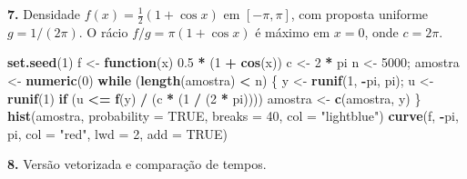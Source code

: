 \documentclass[
  portuguese,
  11pt,
  openany]{book}
\newenvironment{Shaded}{\begin{snugshade}}{\end{snugshade}}
\newcommand{\AttributeTok}[1]{\textcolor[rgb]{0.13,0.29,0.53}{#1}}
\newcommand{\ConstantTok}[1]{\textcolor[rgb]{0.56,0.35,0.01}{#1}}
\newcommand{\ControlFlowTok}[1]{\textcolor[rgb]{0.13,0.29,0.53}{\textbf{#1}}}
\newcommand{\DecValTok}[1]{\textcolor[rgb]{0.00,0.00,0.81}{#1}}
\newcommand{\FloatTok}[1]{\textcolor[rgb]{0.00,0.00,0.81}{#1}}
\newcommand{\FunctionTok}[1]{\textcolor[rgb]{0.13,0.29,0.53}{\textbf{#1}}}
\newcommand{\NormalTok}[1]{#1}
\newcommand{\OtherTok}[1]{\textcolor[rgb]{0.56,0.35,0.01}{#1}}
\newcommand{\SpecialCharTok}[1]{\textcolor[rgb]{0.81,0.36,0.00}{\textbf{#1}}}
\newcommand{\StringTok}[1]{\textcolor[rgb]{0.31,0.60,0.02}{#1}}
\begin{document}
\textbf{7.} Densidade \(f(x) = \tfrac12(1 + \cos x)\) em \([-\pi, \pi]\), com proposta
uniforme \(g = 1/(2\pi)\). O rácio \(f/g = \pi(1 + \cos x)\) é máximo em \(x = 0\),
onde \(c = 2\pi\).

\begin{Shaded}
\begin{Highlighting}[]
\FunctionTok{set.seed}\NormalTok{(}\DecValTok{1}\NormalTok{)}
\NormalTok{f }\OtherTok{\textless{}{-}} \ControlFlowTok{function}\NormalTok{(x) }\FloatTok{0.5} \SpecialCharTok{*}\NormalTok{ (}\DecValTok{1} \SpecialCharTok{+} \FunctionTok{cos}\NormalTok{(x))}
\NormalTok{c }\OtherTok{\textless{}{-}} \DecValTok{2} \SpecialCharTok{*}\NormalTok{ pi}
\NormalTok{n }\OtherTok{\textless{}{-}} \DecValTok{5000}\NormalTok{; amostra }\OtherTok{\textless{}{-}} \FunctionTok{numeric}\NormalTok{(}\DecValTok{0}\NormalTok{)}
\ControlFlowTok{while}\NormalTok{ (}\FunctionTok{length}\NormalTok{(amostra) }\SpecialCharTok{\textless{}}\NormalTok{ n) \{}
\NormalTok{  y }\OtherTok{\textless{}{-}} \FunctionTok{runif}\NormalTok{(}\DecValTok{1}\NormalTok{, }\SpecialCharTok{{-}}\NormalTok{pi, pi); u }\OtherTok{\textless{}{-}} \FunctionTok{runif}\NormalTok{(}\DecValTok{1}\NormalTok{)}
  \ControlFlowTok{if}\NormalTok{ (u }\SpecialCharTok{\textless{}=} \FunctionTok{f}\NormalTok{(y) }\SpecialCharTok{/}\NormalTok{ (c }\SpecialCharTok{*}\NormalTok{ (}\DecValTok{1} \SpecialCharTok{/}\NormalTok{ (}\DecValTok{2} \SpecialCharTok{*}\NormalTok{ pi)))) amostra }\OtherTok{\textless{}{-}} \FunctionTok{c}\NormalTok{(amostra, y)}
\NormalTok{\}}
\FunctionTok{hist}\NormalTok{(amostra, }\AttributeTok{probability =} \ConstantTok{TRUE}\NormalTok{, }\AttributeTok{breaks =} \DecValTok{40}\NormalTok{, }\AttributeTok{col =} \StringTok{"lightblue"}\NormalTok{)}
\FunctionTok{curve}\NormalTok{(f, }\SpecialCharTok{{-}}\NormalTok{pi, pi, }\AttributeTok{col =} \StringTok{"red"}\NormalTok{, }\AttributeTok{lwd =} \DecValTok{2}\NormalTok{, }\AttributeTok{add =} \ConstantTok{TRUE}\NormalTok{)}
\end{Highlighting}
\end{Shaded}

\textbf{8.} Versão vetorizada e comparação de tempos.
\end{document}
